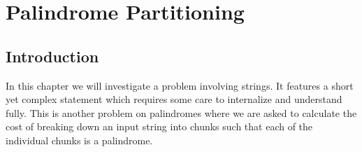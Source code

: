 %

\chapter{Palindrome Partitioning }
\label{ch:palindrome_partitioning2}
\section*{Introduction}
In this chapter we will investigate a problem involving strings. It features a short yet complex 
statement which requires some care to internalize and understand fully. This is another problem on palindromes
where we are asked to calculate the cost of breaking down an input string into chunks such that each of the individual chunks is a palindrome. 

